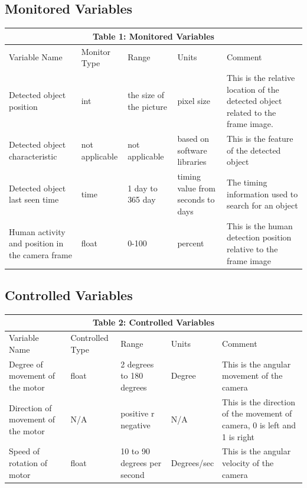 \documentclass[12pt, titlepage]{article}
\begin{document}
\subsection{Monitored Variables}
\begin{tabular}{|p{}|p{}|p{}|p{}|p{}|}

\hline \multicolumn{5}{|c|}{Table 1: Monitored Variables}\\

\hline Variable Name & Monitor Type & Range & Units & Comment\\
\hline Detected object position& int & the size of the picture &pixel size & This is the relative location of the detected object related to the frame image.\\
\hline Detected object characteristic & not applicable & not applicable & 
based on software libraries &This is the feature of the detected object\\
\hline Detected object last seen time& time & 1 day to 365 day & timing value from seconds to days & The timing information used to search for an object\\
\hline Human activity and position in the camera frame&float&0-100&percent&This is the human detection position relative to the frame image\\



\hline

\end{tabular}
\subsection{Controlled Variables}
\begin{tabular}{|p{}|p{}|p{}|p{}|p{}|}

\hline \multicolumn{5}{|c|}{Table 2: Controlled Variables}\\

\hline Variable Name&Controlled Type & Range & Units & Comment\\
\hline Degree of movement of the motor & float & 2 degrees to 180 degrees & Degree&This is the angular movement of the camera\\
\hline Direction of movement of the motor & N/A & positive r negative & N/A & This is the direction of the movement of camera, 0 is left and 1 is right\\
\hline Speed of rotation of motor & float & 10 to 90 degrees per second & Degrees/sec & This is the angular velocity of the camera\\


\hline

\end{tabular}
\end{document}
